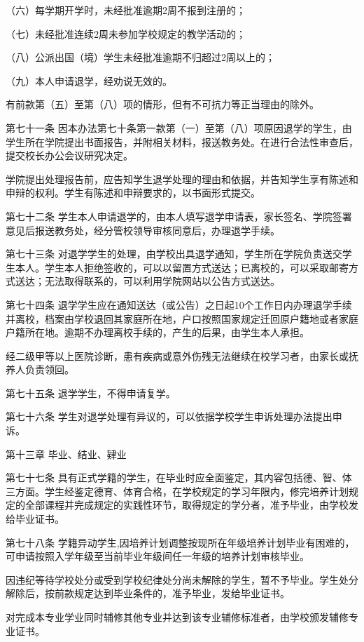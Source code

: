 \documentclass[UTF8,12pt,a4paper]{report}
\begin{document}
（六）每学期开学时，未经批准逾期2周不报到注册的；

（七）未经批准连续2周未参加学校规定的教学活动的；

（八）公派出国（境）学生未经批准逾期不归超过2周以上的；

（九）本人申请退学，经劝说无效的。

有前款第（五）至第（八）项的情形，但有不可抗力等正当理由的除外。

第七十一条  因本办法第七十条第一款第（一）至第（八）项原因退学的学生，由学生所在学院提出书面报告，并附相关材料，报送教务处。在进行合法性审查后，提交校长办公会议研究决定。

学院提出处理报告前，应告知学生退学处理的理由和依据，并告知学生享有陈述和申辩的权利。学生有陈述和申辩要求的，以书面形式提交。

第七十二条  学生本人申请退学的，由本人填写退学申请表，家长签名、学院签署意见后报送教务处，经分管校领导审核同意后，办理退学手续。

第七十三条  对退学学生的处理，由学校出具退学通知，学生所在学院负责送交学生本人。学生本人拒绝签收的，可以以留置方式送达；已离校的，可以采取邮寄方式送达；无法取得联系的，可以利用学院网站以公告方式送达。

第七十四条  退学学生应在通知送达（或公告）之日起10个工作日内办理退学手续并离校，档案由学校退回其家庭所在地，户口按照国家规定迁回原户籍地或者家庭户籍所在地。逾期不办理离校手续的，产生的后果，由学生本人承担。

经二级甲等以上医院诊断，患有疾病或意外伤残无法继续在校学习者，由家长或抚养人负责领回。

第七十五条  退学学生，不得申请复学。

第七十六条  学生对退学处理有异议的，可以依据学校学生申诉处理办法提出申诉。



第十三章  毕业、结业、肄业

第七十七条  具有正式学籍的学生，在毕业时应全面鉴定，其内容包括德、智、体三方面。学生经鉴定德育、体育合格，在学校规定的学习年限内，修完培养计划规定的全部课程并完成规定的实践性环节，取得规定的学分者，准予毕业，由学校发给毕业证书。

第七十八条  学籍异动学生,因培养计划调整按现所在年级培养计划毕业有困难的，可申请按照入学年级至当前毕业年级间任一年级的培养计划审核毕业。

因违纪等待学校处分或受到学校纪律处分尚未解除的学生，暂不予毕业。学生处分解除后，按前款规定达到毕业条件的，准予毕业，发给毕业证书。

对完成本专业学业同时辅修其他专业并达到该专业辅修标准者，由学校颁发辅修专业证书。
\end{document}

